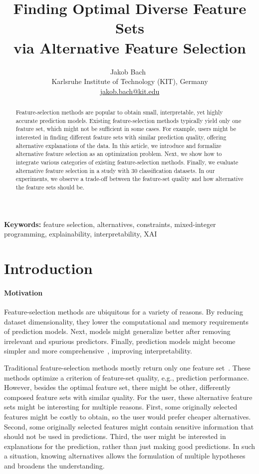 \documentclass{article}
\title{
	Finding Optimal Diverse Feature Sets\\
	via Alternative Feature Selection
}
\author{
	Jakob Bach~\orcidlink{0000-0003-0301-2798}\\
	\small Karlsruhe Institute of Technology (KIT), Germany\\
	\small \href{mailto:jakob.bach@kit.edu}{jakob.bach@kit.edu}
}
\date{} %
\theoremstyle{definition}
\begin{document}
\maketitle

\begin{abstract}
Feature-selection methods are popular to obtain small, interpretable, yet highly accurate prediction models.
Existing feature-selection methods typically yield only one feature set, which might not be sufficient in some cases.
For example, users might be interested in finding different feature sets with similar prediction quality, offering alternative explanations of the data.
In this article, we introduce and formalize alternative feature selection as an optimization problem.
Next, we show how to integrate various categories of existing feature-selection methods.
Finally, we evaluate alternative feature selection in a study with 30 classification datasets.
In our experiments, we observe a trade-off between the feature-set quality and how alternative the feature sets should be.
\end{abstract}
%
\textbf{Keywords:} feature selection, alternatives, constraints, mixed-integer programming, explainability, interpretability, XAI

\section{Introduction}
\label{sec:afs:introduction}

\paragraph{Motivation}

Feature-selection methods are ubiquitous for a variety of reasons.
By reducing dataset dimensionality, they lower the computational and memory requirements of prediction models.
Next, models might generalize better after removing irrelevant and spurious predictors.
Finally, prediction models might become simpler and more comprehensive~\cite{li2017feature}, improving interpretability.

Traditional feature-selection methods mostly return only one feature set~\cite{borboudakis2021extending}.
These methods optimize a criterion of feature-set quality, e.g., prediction performance.
However, besides the optimal feature set, there might be other, differently composed feature sets with similar quality.
For the user, these alternative feature sets might be interesting for multiple reasons.
First, some originally selected features might be costly to obtain, so the user would prefer cheaper alternatives.
Second, some originally selected features might contain sensitive information that should not be used in predictions.
Third, the user might be interested in explanations for the prediction, rather than just making good predictions.
In such a situation, knowing alternatives allows the formulation of multiple hypotheses and broadens the understanding.
\end{document}
